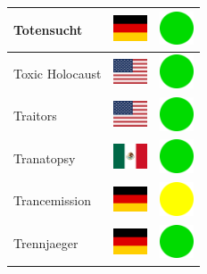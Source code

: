 \documentclass[12pt, a4paper, twoside]{report}
\begin{document}
\begin{center}
\begin{longtable}{|p{5cm}|p{2cm}|p{2cm}|}
Totensucht & \includegraphics[width=1cm]{4x3/de} & \includegraphics[width=1cm]{likes/y} \\ \hline
Toxic Holocaust & \includegraphics[width=1cm]{4x3/us} & \includegraphics[width=1cm]{likes/y} \\ \hline
Traitors & \includegraphics[width=1cm]{4x3/us} & \includegraphics[width=1cm]{likes/y} \\ \hline
Tranatopsy & \includegraphics[width=1cm]{4x3/mx} & \includegraphics[width=1cm]{likes/y} \\ \hline
Trancemission & \includegraphics[width=1cm]{4x3/de} & \includegraphics[width=1cm]{likes/m} \\ \hline
Trennjaeger & \includegraphics[width=1cm]{4x3/de} & \includegraphics[width=1cm]{likes/y} \\ \hline

\end{longtable}
\end{center}
\end{document}
